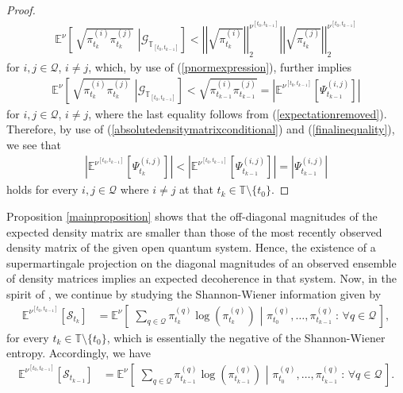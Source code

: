 \documentclass[12pt,a4paper]{article}
\def\T{\mathbb{T}}
\def\G{\mathscr{G}}
\begin{document}
\begin{proof}
\begin{align}
\mathbb{E}^{\nu}\left[ \,  \sqrt{\pi_{t_{k}}^{(i)}\pi_{t_{k}}^{(j)}} \,\, \left| \G_{\T_{[t_0,t_{k-1}]}} \right.\right] < \left|\left| \sqrt{\pi^{(i)}_{t_{k}} }\right|\right|^{\nu^{[t_{0},t_{k-1}]}}_2 \left|\left| \sqrt{\pi^{(j)}_{t_{k}} }\right|\right|^{\nu^{[t_{0},t_{k-1}]}}_2 
\end{align}
for $i,j\in\mathcal{Q}$, $i\neq j$, which, by use of (\ref{pnormexpression}), further implies
 \begin{align}
\mathbb{E}^{\nu}\left[ \,  \sqrt{\pi_{t_{k}}^{(i)}\pi_{t_{k}}^{(j)}} \,\, \left| \G_{\T_{[t_0,t_{k-1}]}} \right.\right] < \sqrt{\pi^{(i)}_{t_{k-1}} \pi^{(j)}_{t_{k-1}}} 
= \left|\mathbb{E}^{\nu^{[t_{0},t_{k-1}]}}\left[\Psi_{t_{k-1}}^{(i,j)}\right] \right| \label{finalinequality}
\end{align}
%
for $i,j\in\mathcal{Q}$, $i\neq j$, where the last equality follows from (\ref{expectationremoved}). Therefore, by use of (\ref{absolutedensitymatrixconditional}) and (\ref{finalinequality}), we see that
%
\begin{align}
\left|\mathbb{E}^{\nu^{[t_{0},t_{k-1}]}}\left[\Psi_{t_{k}}^{(i,j)}\right] \right| < \left|\mathbb{E}^{\nu^{[t_{0},t_{k-1}]}}\left[\Psi_{t_{k-1}}^{(i,j)}\right] \right| = \left| \Psi_{t_{k-1}}^{(i,j)} \right| 
\end{align}
%
holds for every $i,j\in\mathcal{Q}$ where $i\neq j$ at that $t_k\in\T\setminus\{t_0\}$.
\end{proof}
Proposition \ref{mainproposition} shows that the off-diagonal magnitudes of the expected density matrix are smaller than those of the most recently observed density matrix of the given open quantum system. Hence, the existence of a supermartingale projection on the diagonal magnitudes of an observed ensemble of density matrices implies an expected decoherence in that system. Now, in the spirit of \cite{Brody Hughston 2025}, we continue by studying the Shannon-Wiener information given by
\begin{align}
\mathbb{E}^{\nu^{[t_{0},t_{k-1}]}}\left[\mathcal{S}_{t_{k}}\right] &= \mathbb{E}^{\nu}\left[ \,\, \sum_{q\in\mathcal{Q}} \pi_{t_{k}}^{(q)} \log\left( \pi_{t_{k}}^{(q)} \right) \,\, \left| \,\, \pi_{t_{0}}^{(q)}, \ldots, \pi_{t_{k-1}}^{(q)} \,: \, \forall q\in\mathcal{Q} \, \right.\right], \label{expectedshannonentropyexpression}
\end{align}
for every $t_k\in\T\setminus\{t_0\}$, which is essentially the negative of the Shannon-Wiener entropy. 
Accordingly, we have
\begin{align}
\mathbb{E}^{\nu^{[t_{0},t_{k-1}]}}\left[\mathcal{S}_{t_{k-1}}\right] &= \mathbb{E}^{\nu}\left[ \,\, \sum_{q\in\mathcal{Q}} \pi_{t_{k-1}}^{(q)} \log\left( \pi_{t_{k-1}}^{(q)} \right) \,\, \left| \,\, \pi_{t_{0}}^{(q)}, \ldots, \pi_{t_{k-1}}^{(q)} \,: \, \forall q\in\mathcal{Q} \, \right.\right]. \label{initialshannonentropyexpressionfirststatement}
\end{align}
\end{document}
